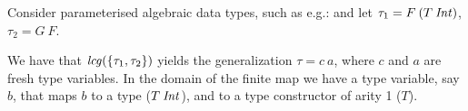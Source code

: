 \begin{Example}
  \label{ex-polykindedness}
  
  Consider parameterised algebraic data types, such as e.g.:
  and let $\tau_1 = F\: (T\: {\it Int\/})$, $\tau_2 = G\: F$. 

  We have that ${\it lcg\/}(\{\tau_1,\tau_2\})$ yields the generalization
  $\tau = c\: a$, where $c$ and $a$ are fresh type variables.  In the
  domain of the finite map we have a type variable, say $b$, that maps
  $b$ to a type ($T\:{\it Int\/}$), and to a type constructor of arity 1 ($T$). 

\end{Example}

\begin{figure}[ht]
\end{figure}
